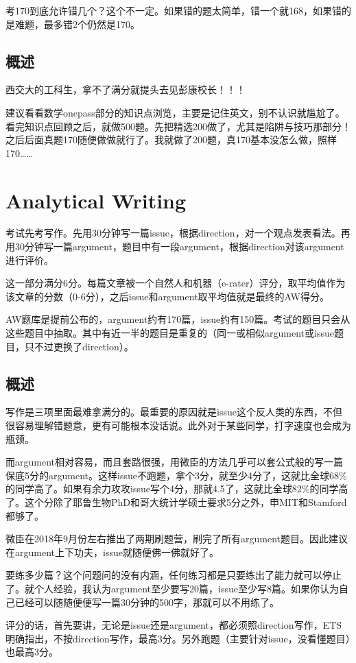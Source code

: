 \documentclass[cn,plain]{elegantbookex}
\begin{document}
考170到底允许错几个？这个不一定。如果错的题太简单，错一个就168，如果错的是难题，最多错2个仍然是170。

\section{概述}
西交大的工科生，拿不了满分就提头去见彭康校长！！！

建议看看数学onepass部分的知识点浏览，主要是记住英文，别不认识就尴尬了。看完知识点回顾之后，就做500题。先把精选200做了，尤其是陷阱与技巧那部分！之后后面真题170随便做做就行了。我就做了200题，真170基本没怎么做，照样170……

\chapter{Analytical Writing}
考试先考写作。先用30分钟写一篇issue，根据direction，对一个观点发表看法。再用30分钟写一篇argument，题目中有一段argument，根据direction对该argument进行评价。

这一部分满分6分。每篇文章被一个自然人和机器（e-rater）评分，取平均值作为该文章的分数（0-6分），之后issue和argument取平均值就是最终的AW得分。

AW题库是提前公布的，argument约有170篇，issue约有150篇。考试的题目只会从这些题目中抽取。其中有近一半的题目是重复的（同一或相似argument或issue题目，只不过更换了direction）。

\section{概述}
写作是三项里面最难拿满分的。最重要的原因就是issue这个反人类的东西，不但很容易理解错题意，更有可能根本没话说。此外对于某些同学，打字速度也会成为瓶颈。

而argument相对容易，而且套路很强，用微臣的方法几乎可以套公式般的写一篇保底5分的argument。这样issue不跑题，拿个3分，就至少4分了，这就比全球68\%的同学高了。如果有余力攻攻issue写个4分，那就4.5了，这就比全球82\%的同学高了。这个分除了耶鲁生物PhD和哥大统计学硕士要求5分之外，申MIT和Stamford都够了。

微臣在2018年9月份左右推出了两期刷题营，刷完了所有argument题目。因此建议在argument上下功夫，issue就随便佛一佛就好了。

要练多少篇？这个问题问的没有内涵，任何练习都是只要练出了能力就可以停止了。就个人经验，我认为argument至少要写20篇，issue至少写8篇。如果你认为自己已经可以随随便便写一篇30分钟的500字，那就可以不用练了。

评分的话，首先要讲，无论是issue还是argument，都必须照direction写作，ETS明确指出，不按direction写作，最高3分。另外跑题（主要针对issue，没看懂题目）也最高3分。
\end{document}

